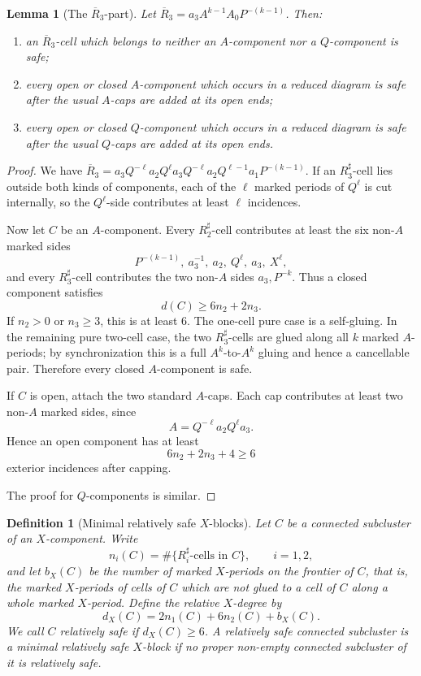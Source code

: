 \documentclass{article}
\newtheorem{lm}[theorem]{Lemma}
\newtheorem{df}[theorem]{Definition}
\begin{document}
\begin{lm}[The $\overline R_3$-part]
Let $\overline R_3=a_3A^{k-1}A_0P^{-(k-1)}$.  Then:
\begin{enumerate}
\item an $\overline R_3$-cell which belongs to neither an $A$-component nor a
$Q$-component is safe;
\item every open or closed $A$-component which occurs in a reduced diagram is
safe after the usual $A$-caps are added at its open ends;
\item every open or closed $Q$-component which occurs in a reduced diagram is
safe after the usual $Q$-caps are added at its open ends.
\end{enumerate}
\end{lm}

\begin{proof}
We have $\overline R_3=a_3Q^{-\ell}a_2Q^{\ell}a_3Q^{-\ell}a_2Q^{\ell -1}a_1P^{-(k-1)}$. If an $R_3^{\sharp}$-cell lies outside both kinds of components, each of the
$\ell$ marked periods of $Q^{\ell}$ is cut internally, so the $Q^{\ell}$-side contributes
at least $\ell$ incidences. 

Now let $C$ be an $A$-component.  Every $R_2^{\sharp}$-cell contributes at
least the six non-$A$ marked sides
\[
 P^{-(k-1)},\ a_3^{-1},\ a_2,\ Q^{\ell},\ a_3,\ X^{\ell},
\]
and every $R_3^{\sharp}$-cell contributes the two non-$A$ sides
$a_3,P^{-k}$.  Thus a closed component satisfies
\[
        d(C)\geq6n_2+2n_3.
\]
If $n_2>0$ or $n_3\geq3$, this is at least $6$.  The one-cell pure case is a
self-gluing.  In the remaining pure two-cell case, the two
$R_3^{\sharp}$-cells are glued along all $k$ marked $A$-periods; by
synchronization this is a full $A^k$-to-$A^k$ gluing and hence a cancellable
pair.  Therefore every closed $A$-component is safe.

If $C$ is open, attach the two standard $A$-caps.  Each cap contributes at
least two non-$A$ marked sides, since
\[
        A=Q^{-\ell}a_2Q^{\ell}a_3.
\]
Hence an open component has at least
\[
        6n_2+2n_3+4\geq6
\]
exterior incidences after capping.

The proof for $Q$-components is similar.  
\end{proof}

\begin{df}[Minimal relatively safe $X$-blocks]
Let $C$ be a connected subcluster of an $X$-component.  Write
\[
        n_i(C)=\#\{R_i^{\sharp}\text{-cells in }C\},\qquad i=1,2,
\]
and let $b_X(C)$ be the number of marked $X$-periods on the frontier of $C$,
that is, the marked $X$-periods of cells of $C$ which are not glued to a cell
of $C$ along a whole marked $X$-period.  Define the relative $X$-degree by
\[
        d_X(C)=2n_1(C)+6n_2(C)+b_X(C).
\]
We call $C$ relatively safe if $d_X(C)\geq 6$.  A relatively safe connected
subcluster is a minimal relatively safe $X$-block if no proper non-empty
connected subcluster of it is relatively safe.
\end{df}
\end{document}
